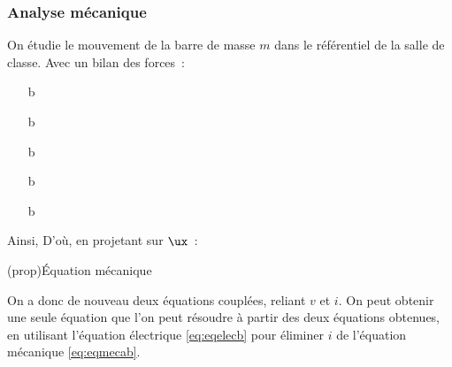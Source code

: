 \documentclass[../../main/main.tex]{subfiles}
\begin{document}
\subsubsection{Analyse mécanique}
\label{sssec:rlplgene_anameca}
On étudie le mouvement de la barre de masse $m$ dans le référentiel de la
salle de classe. Avec un bilan des forces~:
\begin{itemize}
	\item[b]{} %
	\item[b]{} %
	\item[b]{} %
	\item[b]{} %
	\item[b]{} %
\end{itemize}
Ainsi,
\psw{%
	\[
		m \dv{\vv{v}}{t} = \vv{P} + \vv{N} + \vv{F} + \vv{F_f} + \vv{F\ind{Lap}}
	\]
}%
D'où, en projetant sur $\ux$~:
\begin{tcb*}(prop){Équation mécanique}
\end{tcb*}

On a donc de nouveau deux équations couplées, reliant $v$ et $i$. On peut
obtenir une seule équation que l'on peut résoudre à partir des deux équations
obtenues, en utilisant l'équation électrique \eqref{eq:eqelecb} pour éliminer
$i$ de l'équation mécanique \eqref{eq:eqmecab}.
\end{document}
